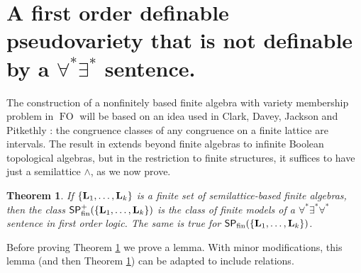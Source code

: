 \documentclass[10pt,a4paper]{amsart}
\theoremstyle{plain}
\newtheorem{thm}{Theorem}[section]
\theoremstyle{definition}
\newcommand{\FO}{\operatorname{FO}}
\begin{document}
 

\section{A first order definable pseudovariety that is not definable by a $\forall^*\exists^*$ sentence.}\label{sec:FO}
The construction of a nonfinitely based finite algebra with variety membership problem in $\FO$ will be based on an idea used in Clark, Davey, Jackson and Pitkethly \cite[Theorem 4.2]{CDJP}: the congruence classes of any congruence on a finite lattice are intervals. The result in \cite{CDJP} extends beyond finite algebras to infinite Boolean topological algebras, but in the restriction to finite structures, it suffices to have just a semilattice $\wedge$, as we now prove.  

\begin{thm}\label{thm:FOq}
If $\{{\bf L}_1,\dots,{\bf L}_k\}$ is a finite set of semilattice-based finite algebras, then the class $\mathsf{SP}_{\rm fin}^+(\{{\bf L}_1,\dots,{\bf L}_k\})$ is the class of finite models of a $\forall^*\exists^*\forall^*$ sentence in first order logic.  The same is true for $\mathsf{SP}_{\rm fin}(\{{\bf L}_1,\dots,{\bf L}_k\})$.
\end{thm}

Before proving Theorem \ref{thm:FOq} we prove a lemma.  With minor modifications, this lemma (and then Theorem \ref{thm:FOq}) can  be adapted to include relations.
\end{document}
